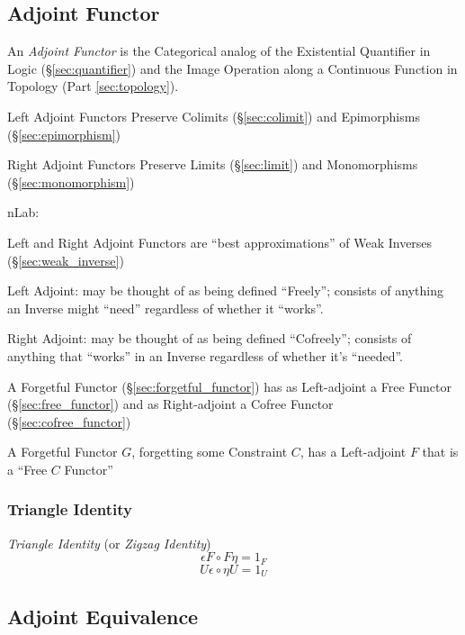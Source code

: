 \subsection{Adjoint Functor}\label{sec:adjoint_functor}

An \emph{Adjoint Functor} is the Categorical analog of the Existential
Quantifier in Logic (\S\ref{sec:quantifier}) and the Image Operation
along a Continuous Function in Topology (Part \ref{sec:topology}).

Left Adjoint Functors Preserve Colimits (\S\ref{sec:colimit}) and
Epimorphisms (\S\ref{sec:epimorphism})

Right Adjoint Functors Preserve Limits (\S\ref{sec:limit}) and
Monomorphisms (\S\ref{sec:monomorphism})

nLab:

Left and Right Adjoint Functors are ``best approximations'' of Weak
Inverses (\S\ref{sec:weak_inverse})

Left Adjoint: may be thought of as being defined ``Freely''; consists
of anything an Inverse might ``need'' regardless of whether it
``works''.

Right Adjoint: may be thought of as being defined ``Cofreely'';
consists of anything that ``works'' in an Inverse regardless of
whether it's ``needed''.

A Forgetful Functor (\S\ref{sec:forgetful_functor}) has as
Left-adjoint a Free Functor (\S\ref{sec:free_functor}) and as
Right-adjoint a Cofree Functor (\S\ref{sec:cofree_functor})

A Forgetful Functor $G$, forgetting some Constraint $C$, has a
Left-adjoint $F$ that is a ``Free $C$ Functor'' %



\subsubsection{Triangle Identity}\label{sec:triangle_identity}

\emph{Triangle Identity} (or \emph{Zigzag Identity})
\[
  \epsilon F \circ F \eta = 1_F
\]\[
  U \epsilon \circ \eta U = 1_U
\]



\subsection{Adjoint Equivalence}\label{sec:adjoint_equivalence}

